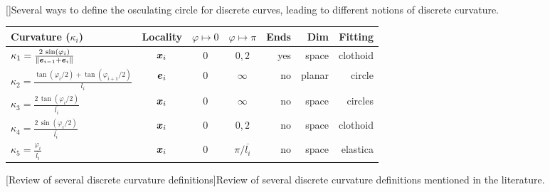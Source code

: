 \begin{figure}[p]
\centering
\renewcommand{\arraystretch}{1.5}
		\vspace{-0.5cm}
		\hspace{5mm}
    		 \\[-10pt]
		\hspace{5mm}
		\vspace{10pt}
		[]{Several ways to define the osculating circle for discrete curves, leading to different notions of discrete curvature.}
		\label{fig:kb_def}
		\vspace{0.75cm}
 		\begin{tabularx}{0.9\textwidth}{@{} X c c c r r r @{}}
      		\toprule
		Curvature ($\kappa_i$) 										&  Locality 	&  $\varphi \mapsto 0$ 	&  $\varphi \mapsto \pi$ 		& Ends  	& Dim 	&  Fitting			\\
		\midrule
		$\kappa_1 = \frac{2\, \sin(\varphi_i)}{\lVert\boldsymbol{e}_{i-1}+\boldsymbol{e}_i\rVert}$ 	&  $\boldsymbol{x}_i$ 	&  $0$				&  $0, 2$					&  yes	&  space	&  clothoid			\\
		$\kappa_2 = \frac{\tan(\varphi_i/2)+\tan(\varphi_{i+1}/2)}{l_i}$ 			&  $\boldsymbol{e}_i$ 	&  $0$				&  $\infty$					&  no		&  planar	&  circle			\\
 		$\kappa_3 = \frac{2\, \tan(\varphi_i / 2)}{\overbar{l_i}} $				&  $\boldsymbol{x}_i$	&  $0$ 				&  $\infty$					&  no		&  space	&  circles			\\
		\midrule
		$\kappa_4 = \frac{2\,\sin(\varphi_i / 2)}{\overbar{l_i}}$ 				&  $\boldsymbol{x}_i$	&  $0$				&  $0, 2$					&  no		&  space	&  clothoid  		\\
		$\kappa_5 = \frac{\varphi_i}{\overbar{l_i}}$ 						&  $\boldsymbol{x}_i$	&  $0$				&  $\pi/\overbar{l_i}$			&  no		&  space	&  elastica  		\\
		\bottomrule
		\end{tabularx}
		\vspace{10pt}
		[Review of several discrete curvature definitions]{Review of several discrete curvature definitions mentioned in the literature.}
		\label{tab:kb_def}
\end{figure}

